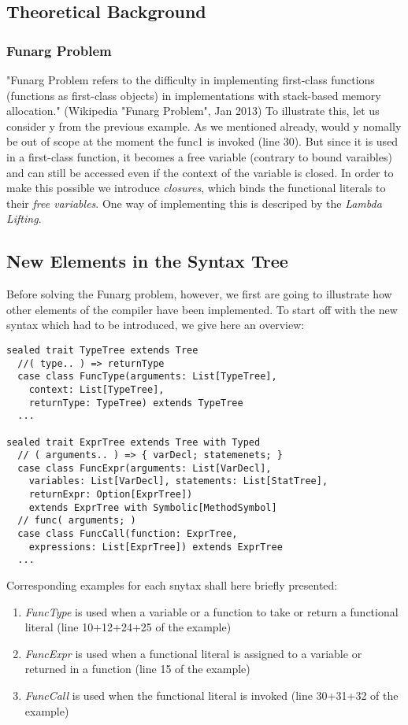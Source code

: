 \subsection{Theoretical Background}

\subsubsection{Funarg Problem}
"Funarg Problem refers to the difficulty in implementing first-class functions (functions as first-class objects) in implementations with stack-based memory allocation." (Wikipedia "Funarg Problem", Jan 2013) To illustrate this, let us consider y from the previous example. As we mentioned already, would y nomally be out of scope at the moment the func1 is invoked (line 30). But since it is used in a first-class function, it becomes a free variable (contrary to bound varaibles) and can still be accessed even if the context of the variable is closed. In order to make this possible we introduce \emph{closures}, which binds the functional literals to their \emph{free variables}. One way of implementing this is descriped by the \emph{Lambda Lifting}. \newline

\subsection{New Elements in the Syntax Tree}
Before solving the Funarg problem, however, we first are going to illustrate how other elements of the compiler have been implemented. To start off with the new syntax which had to be introduced, we give here an overview:

\begin{lstlisting}
sealed trait TypeTree extends Tree
  //( type.. ) => returnType
  case class FuncType(arguments: List[TypeTree],
    context: List[TypeTree], 
    returnType: TypeTree) extends TypeTree
  ...

sealed trait ExprTree extends Tree with Typed
  // ( arguments.. ) => { varDecl; statemenets; }
  case class FuncExpr(arguments: List[VarDecl],
    variables: List[VarDecl], statements: List[StatTree],
    returnExpr: Option[ExprTree])
    extends ExprTree with Symbolic[MethodSymbol]
  // func( arguments; )
  case class FuncCall(function: ExprTree,
    expressions: List[ExprTree]) extends ExprTree
  ...
\end{lstlisting}

Corresponding examples for each snytax shall here briefly presented:
\begin{enumerate}
\item \emph{FuncType} is used when a variable or a function to take or return a functional literal (line 10+12+24+25 of the example)
\item \emph{FuncExpr} is used when a functional literal is assigned to a variable or returned in a function (line 15 of the example)
\item \emph{FuncCall} is used when the functional literal is invoked (line 30+31+32 of the example)
\end{enumerate}


